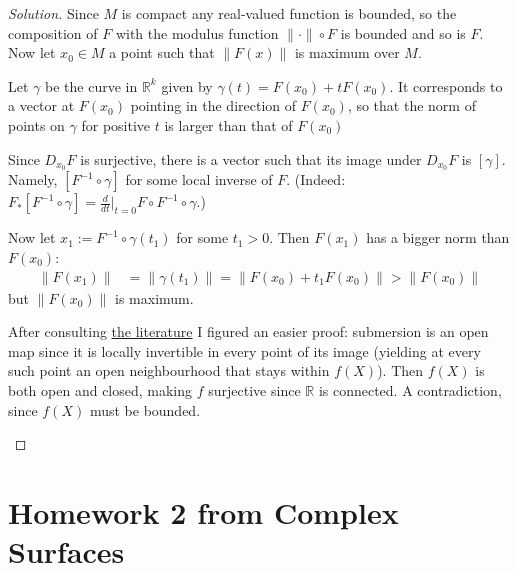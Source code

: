 \begin{proof}[Solution]\leavevmode
	Since \(M\) is compact any real-valued function is bounded, so the composition of \(F\) with the modulus function \(\|\cdot\| \circ F\) is bounded and so is \(F\). Now let \(x_0 \in M\) a point such that \(\|F(x)\|\) is maximum over \(M\).

Let \(\gamma\) be the curve in \(\mathbb{R}^k\) given by \(\gamma(t)=F(x_0)+tF(x_0)\). It corresponds to a vector at \(F(x_0)\) pointing in the direction of \(F(x_0)\), so that the norm of points on \(\gamma\) for positive \(t\) is larger than that of \(F(x_0)\)

Since \(D_{x_0}F\) is surjective, there is a vector such that its image under \(D_{x_0}F\) is \([\gamma]\). Namely, \([F^{-1}\circ \gamma]\) for some local inverse of \(F\). (Indeed: \(F_*[F^{-1}\circ \gamma]=\frac{d}{dt}\Big|_{t=0}F \circ F^{-1} \circ \gamma\).)

Now let \(x_1:=F^{-1} \circ \gamma(t_1)\) for some \(t_1>0\). Then \(F(x_1)\) has a bigger norm than \(F(x_0)\):
\begin{align*}
\|F(x_1)\|&=\|\gamma(t_1)\|=\|F(x_0)+t_1F(x_0)\|>\|F(x_0)\|
\end{align*}
but \(\|F(x_0)\|\) is maximum.

\begin{remark}\leavevmode
	After consulting \href{https://math.stackexchange.com/questions/470164/a-submersion-f-mathcalx-to-mathcaly-must-be-surjective}{the literature} I figured an easier proof:  submersion is an open map since it is locally invertible in every point of its image (yielding at every such point an open neighbourhood that stays within \(f(X)\)). Then \(f(X)\) is both open and closed, making \(f\) surjective since \(\mathbb{R}\) is connected. A contradiction, since \(f(X)\) must be bounded.
\end{remark}

\end{proof}

\section{Homework 2 from Complex Surfaces}








